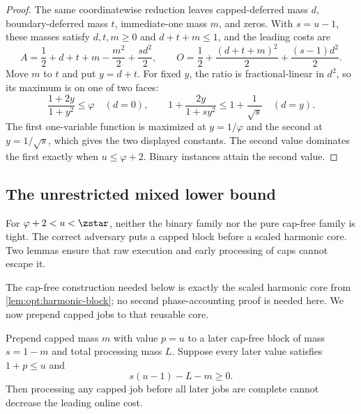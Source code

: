 \begin{proof}
The same coordinatewise reduction leaves capped-deferred mass $d$,
boundary-deferred mass $t$, immediate-one mass $m$, and zeros.  With
$s=u-1$, these masses satisfy $d,t,m\ge0$ and $d+t+m\le1$, and the leading
costs are
\begin{equation}
 A=\frac12+d+t+m-\frac{m^2}{2}+\frac{s d^2}{2},
 \qquad
 O=\frac12+\frac{(d+t+m)^2}{2}+\frac{(s-1)d^2}{2}.
\end{equation}
Move $m$ to $t$ and put $y=d+t$.  For fixed $y$, the ratio is
fractional-linear in $d^2$, so its maximum is on one of two faces:
\begin{equation}
 \frac{1+2y}{1+y^2}\le\varphi
 \quad(d=0),
 \qquad
 1+\frac{2y}{1+s y^2}\le1+\frac1{\sqrt s}
 \quad(d=y).
\end{equation}
The first one-variable function is maximized at $y=1/\varphi$ and the second
at $y=1/\sqrt s$, which gives the two displayed constants.
The second value dominates the first exactly when
$u\le\varphi+2$.  Binary instances attain the second value.
\end{proof}



\subsection{The unrestricted mixed lower bound}
\label{sec:opt:mixed-lower}

For $\varphi+2<u<\zstar$, neither the binary family nor the pure cap-free
family is tight.  The correct adversary puts a capped block before a scaled
harmonic core.  Two lemmas ensure that raw
execution and early processing of caps cannot escape it.

The cap-free construction needed below is exactly the scaled harmonic core
from \cref{lem:opt:harmonic-block}; no second phase-accounting proof is
needed here.  We now prepend capped jobs to that reusable core.

\begin{lemma}
\label{lem:opt:cap-deferral}
Prepend capped mass $m$ with value $p=u$ to a later cap-free block of mass
$s=1-m$ and total processing mass $L$.  Suppose every later value satisfies
$1+p\le u$ and
\begin{equation}
 s(u-1)-L-m\ge0.
 \label{eq:opt:cap-deferral-condition}
\end{equation}
Then processing any capped job before all later jobs are complete cannot
decrease the leading online cost.
\end{lemma}


